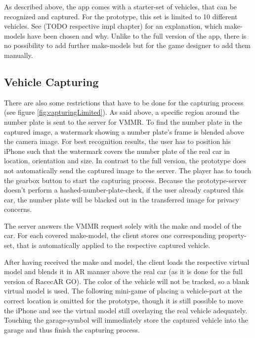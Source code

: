 As described above, the app comes with a starter-set of vehicles, that can be recognized and captured. For the prototype, this set is limited to 10 different vehicles. See (TODO respective impl chapter) for an explanation, which make-models have been chosen and why. Unlike to the full version of the app, there is no possibility to add further make-models but for the game designer to add them manually.

\subsection{Vehicle Capturing}
There are also some restrictions that have to be done for the capturing process (see figure \ref{fig:capturingLimited}). As said above, a specific region around the number plate is sent to the server for VMMR. To find the number plate in the captured image, a watermark showing a number plate's frame is blended above the camera image. For best recognition results, the user has to position his iPhone such that the watermark covers the number plate of the real car in location, orientation and size. In contrast to the full version, the prototype does not automatically send the captured image to the server. The player has to touch the gearbox button to start the capturing process. Because the prototype-server doesn't perform a hashed-number-plate-check, if the user already captured this car, the number plate will be blacked out in the transferred image for privacy concerns.

The server answers the VMMR request solely with the make and model of the car. For each covered make-model, the client stores one corresponding property-set, that is automatically applied to the respective captured vehicle.

After having received the make and model, the client loads the respective virtual model and blends it in AR manner above the real car (as it is done for the full version of RacecAR GO). The color of the vehicle will not be tracked, so a blank virtual model is used. The following mini-game of placing a vehicle-part at the correct location is omitted for the prototype, though it is still possible to move the iPhone and see the virtual model still overlaying the real vehicle adequately. Touching the garage-symbol will immediately store the captured vehicle into the garage and thus finish the capturing process.

